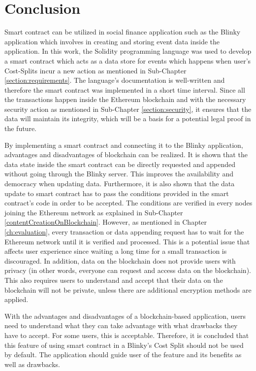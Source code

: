 \chapter{Conclusion}
\label{ch:conclusion}

Smart contract can be utilized in social finance application such as the Blinky application which involves in creating and storing event data inside the application. In this work, the Solidity programming language was used to develop a smart contract which acts as a data store for events which happens when user's Cost-Splits incur a new action as mentioned in Sub-Chapter \ref{section:requirements}. The language's documentation is well-written and therefore the smart contract was implemented in a short time interval. Since all the transactions happen inside the Ethereum blockchain and with the necessary security action as mentioned in Sub-Chapter \ref{section:security}, it ensures that the data will maintain its integrity, which will be a basis for a potential legal proof in the future.

By implementing a smart contract and connecting it to the Blinky application, advantages and disadvantages of blockchain can be realized. It is shown that the data state inside the smart contract can be directly requested and appended without going through the Blinky server. This improves the availability and democracy when updating data. Furthermore, it is also shown that the data update to smart contract has to pass the conditions provided in the smart contract's code in order to be accepted. The conditions are verified in every nodes joining the Ethereum network as explained in Sub-Chapter \ref{contentCreationOnBlockchain}. However, as mentioned in Chapter \ref{ch:evaluation}, every transaction or data appending request has to wait for the Ethereum network until it is verified and processed. This is a potential issue that affects user experience since waiting a long time for a small transaction is discouraged. In addition, data on the blockchain does not provide users with privacy (in other words, everyone can request and access data on the blockchain). This also requires users to understand and accept that their data on the blockchain will not be private, unless there are additional encryption methods are applied.

With the advantages and disadvantages of a blockchain-based application, users need to understand what they can take advantage with what drawbacks they have to accept. For some users, this is acceptable. Therefore, it is concluded that this feature of using smart contract in a Blinky's Cost Split should not be used by default. The application should guide user of the feature and its benefits as well as drawbacks.




\ifnameyear
  
\else
  
\fi
